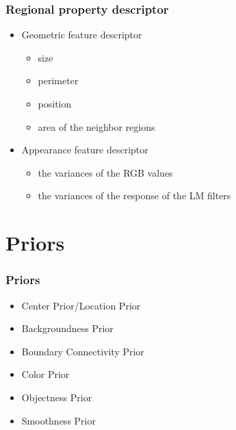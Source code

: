 \documentclass[notheorems,serif,table,compress]{beamer}  %
\begin{document}
\begin{frame}
\frametitle{Regional property descriptor}
\begin{itemize}
\item Geometric feature descriptor 
\begin{itemize}
\item size
\item perimeter
\item position
\item area of the neighbor regions
\end{itemize}
\item Appearance feature descriptor
\begin{itemize}
\item the variances of the RGB values
\item the variances of the response of the LM filters
\end{itemize}
\end{itemize}
\end{frame}


\section{Priors}

\begin{frame}
\frametitle{Priors}
\begin{itemize}
\item Center Prior/Location Prior
\item Backgroundness Prior
\item Boundary Connectivity Prior
\item Color Prior
\item Objectness Prior
\item Smoothness Prior
\end{itemize}
\end{frame}
\end{document}
